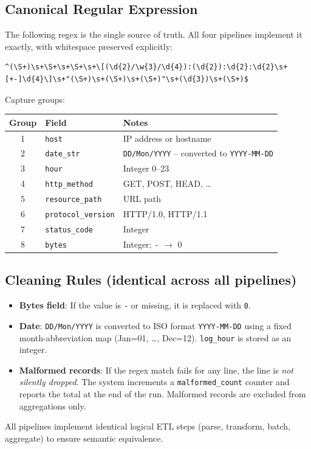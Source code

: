 \documentclass[12pt,a4paper]{article}
\begin{document}
\subsection{Canonical Regular Expression}
The following regex is the single source of truth. All four pipelines implement it exactly, with whitespace preserved explicitly:
\begin{lstlisting}
^(\S+)\s+\S+\s+\S+\s+\[(\d{2}/\w{3}/\d{4}):(\d{2}):\d{2}:\d{2}\s+[+-]\d{4}\]\s+"(\S+)\s+(\S+)\s+(\S+)"\s+(\d{3})\s+(\S+)$
\end{lstlisting}

Capture groups:
\begin{center}
\begin{tabular}{cll}
\toprule
\textbf{Group} & \textbf{Field} & \textbf{Notes} \\
\midrule
1 & \texttt{host}      & IP address or hostname \\
2 & \texttt{date\_str} & \texttt{DD/Mon/YYYY} -- converted to \texttt{YYYY-MM-DD} \\
3 & \texttt{hour}      & Integer 0--23 \\
4 & \texttt{http\_method}    & GET, POST, HEAD, \ldots \\
5 & \texttt{resource\_path}  & URL path \\
6 & \texttt{protocol\_version} & HTTP/1.0, HTTP/1.1 \\
7 & \texttt{status\_code}    & Integer \\
8 & \texttt{bytes}           & Integer; \texttt{-} $\rightarrow$ 0 \\
\bottomrule
\end{tabular}
\end{center}

\subsection{Cleaning Rules (identical across all pipelines)}
\begin{itemize}
    \item \textbf{Bytes field}: If the value is \texttt{-} or missing, it is replaced with \texttt{0}.
    \item \textbf{Date}: \texttt{DD/Mon/YYYY} is converted to ISO format \texttt{YYYY-MM-DD} using a fixed month-abbreviation map (Jan=01, \ldots, Dec=12). \texttt{log\_hour} is stored as an integer.
    \item \textbf{Malformed records}: If the regex match fails for any line, the line is \emph{not silently dropped}. The system increments a \texttt{malformed\_count} counter and reports the total at the end of the run. Malformed records are excluded from aggregations only.
\end{itemize}
All pipelines implement identical logical ETL steps (parse, transform, batch, aggregate) to ensure semantic equivalence.
\end{document}
